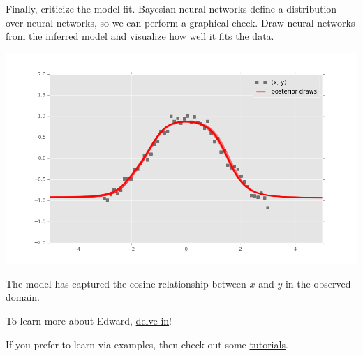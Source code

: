 Finally, criticize the model fit. Bayesian neural networks define a distribution
over neural networks, so we can perform a graphical check. Draw neural networks
from the inferred model and visualize how well it fits the data.

\includegraphics[width=700px]{images/getting-started-fig1.png}

The model has captured the cosine relationship between $x$ and $y$
in the observed domain.

To learn more about Edward, \href{/api}{delve in}!

If you prefer to learn via examples, then check out some
\href{/tutorials/}{tutorials}.
